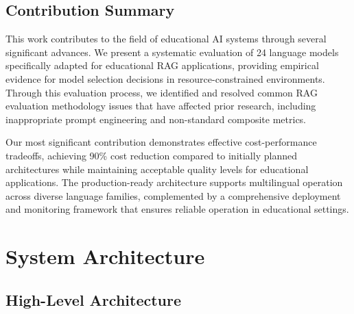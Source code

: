 \documentclass[12pt,a4paper]{article}
\begin{document}
\subsection{Contribution Summary}
This work contributes to the field of educational AI systems through several significant advances. We present a systematic evaluation of 24 language models specifically adapted for educational RAG applications, providing empirical evidence for model selection decisions in resource-constrained environments. Through this evaluation process, we identified and resolved common RAG evaluation methodology issues that have affected prior research, including inappropriate prompt engineering and non-standard composite metrics.

Our most significant contribution demonstrates effective cost-performance tradeoffs, achieving 90\% cost reduction compared to initially planned architectures while maintaining acceptable quality levels for educational applications. The production-ready architecture supports multilingual operation across diverse language families, complemented by a comprehensive deployment and monitoring framework that ensures reliable operation in educational settings.

\section{System Architecture}

\subsection{High-Level Architecture}
\end{document}
